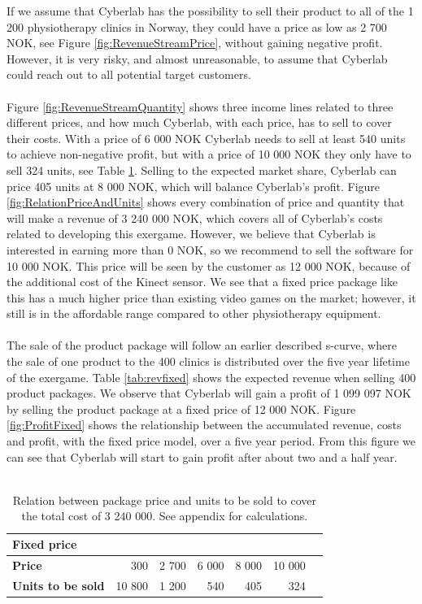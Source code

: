 If we assume that Cyberlab has the possibility to sell their product to all of the 1 200 physiotherapy clinics in Norway, they could have a price as low as 2 700 NOK, see Figure \ref{fig:RevenueStreamPrice}, without gaining negative profit. However, it is very risky, and almost unreasonable, to assume that Cyberlab could reach out to all potential target customers. \\ \\
Figure \ref{fig:RevenueStreamQuantity} shows three income lines related to three different prices, and how much Cyberlab, with each price, has to sell to cover their costs. With a price of 6 000 NOK Cyberlab needs to sell at least 540 units to achieve non-negative profit, but with a price of 10 000 NOK they only have to sell 324 units, see Table \ref{tab:unitsfixed}. Selling to the expected market share, Cyberlab can price 405 units at 8 000 NOK, which will balance Cyberlab's profit. Figure \ref{fig:RelationPriceAndUnits} shows every combination of price and quantity that will make a revenue of 3 240 000 NOK, which covers all of Cyberlab's costs related to developing this exergame. However, we believe that Cyberlab is interested in earning more than 0 NOK, so we recommend to sell the software for 10 000 NOK. This price will be seen by the customer as 12 000 NOK, because of the additional cost of the Kinect sensor. We see that a fixed price package like this has a much higher price than existing video games on the market; however, it still is in the affordable range compared to other physiotherapy equipment. \\ \\
The sale of the product package will follow an earlier described s-curve, where the sale of one product to the 400 clinics is distributed over the five year lifetime of the exergame. Table \ref{tab:revfixed} shows the expected revenue when selling 400 product packages. We observe that Cyberlab will gain a profit of 1 099 097 NOK by selling the product package at a fixed price of 12 000 NOK. Figure \ref{fig:ProfitFixed} shows the relationship between the accumulated revenue, costs and profit, with the fixed price model, over a five year period. From this figure we can see that Cyberlab will start to gain profit after about two and a half year. \\ \\
\begin{table}
\centering
\caption[Price and Unit examples with the fixed price model]{Relation between package price and units to be sold to cover the total cost of 3 240 000. See appendix for calculations.}
    \begin{tabular}{|l|r|r|r|r|r|r|}
        \hline
       \textbf{Fixed price}  & & & & & \\ \hline
      \textbf{Price} & 300 & 2 700 & 6 000 & 8 000 & 10 000 \\ \hline
	   \textbf{Units to be sold} & 10 800 & 1 200 & 540 & 405 & 324 \\ \hline	
    \end{tabular}
    \label{tab:unitsfixed}
\end{table}

